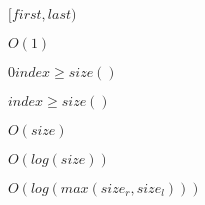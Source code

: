 \documentclass{article}
\begin{document}
$ [first, last) $
\pagebreak

$ O(1) $
\pagebreak

$ 0 index \geq size() $
\pagebreak

$ index \geq size() $
\pagebreak

$ O(size) $
\pagebreak

$ O(log(size)) $
\pagebreak

$ O(log(max(size_r, size_l))) $
\pagebreak
\end{document}
